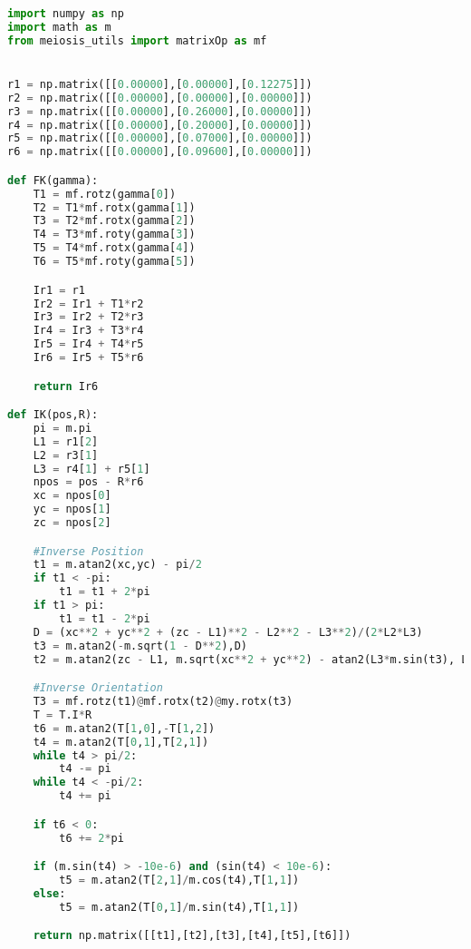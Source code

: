 \begin{lstlisting}[frame=lines,language=Python, caption=meiosis\_kinematics.py]
import numpy as np
import math as m
from meiosis_utils import matrixOp as mf


r1 = np.matrix([[0.00000],[0.00000],[0.12275]])
r2 = np.matrix([[0.00000],[0.00000],[0.00000]])
r3 = np.matrix([[0.00000],[0.26000],[0.00000]])
r4 = np.matrix([[0.00000],[0.20000],[0.00000]])
r5 = np.matrix([[0.00000],[0.07000],[0.00000]])
r6 = np.matrix([[0.00000],[0.09600],[0.00000]])

def FK(gamma):
    T1 = mf.rotz(gamma[0])
    T2 = T1*mf.rotx(gamma[1])
    T3 = T2*mf.rotx(gamma[2])
    T4 = T3*mf.roty(gamma[3])
    T5 = T4*mf.rotx(gamma[4])
    T6 = T5*mf.roty(gamma[5])

    Ir1 = r1
    Ir2 = Ir1 + T1*r2
    Ir3 = Ir2 + T2*r3
    Ir4 = Ir3 + T3*r4
    Ir5 = Ir4 + T4*r5
    Ir6 = Ir5 + T5*r6

    return Ir6

def IK(pos,R):
    pi = m.pi
    L1 = r1[2]
    L2 = r3[1]
    L3 = r4[1] + r5[1]
    npos = pos - R*r6
    xc = npos[0]
    yc = npos[1]
    zc = npos[2]

    #Inverse Position
    t1 = m.atan2(xc,yc) - pi/2
    if t1 < -pi:
        t1 = t1 + 2*pi
    if t1 > pi:
        t1 = t1 - 2*pi
    D = (xc**2 + yc**2 + (zc - L1)**2 - L2**2 - L3**2)/(2*L2*L3)
    t3 = m.atan2(-m.sqrt(1 - D**2),D)
    t2 = m.atan2(zc - L1, m.sqrt(xc**2 + yc**2) - atan2(L3*m.sin(t3), L2 + L3*cos(t3)))

    #Inverse Orientation
    T3 = mf.rotz(t1)@mf.rotx(t2)@my.rotx(t3)
    T = T.I*R
    t6 = m.atan2(T[1,0],-T[1,2])
    t4 = m.atan2(T[0,1],T[2,1])
    while t4 > pi/2:
        t4 -= pi
    while t4 < -pi/2:
        t4 += pi

    if t6 < 0:
        t6 += 2*pi

    if (m.sin(t4) > -10e-6) and (sin(t4) < 10e-6):
        t5 = m.atan2(T[2,1]/m.cos(t4),T[1,1])
    else:
        t5 = m.atan2(T[0,1]/m.sin(t4),T[1,1])

    return np.matrix([[t1],[t2],[t3],[t4],[t5],[t6]])
\end{lstlisting}
\vspace{10ex}

